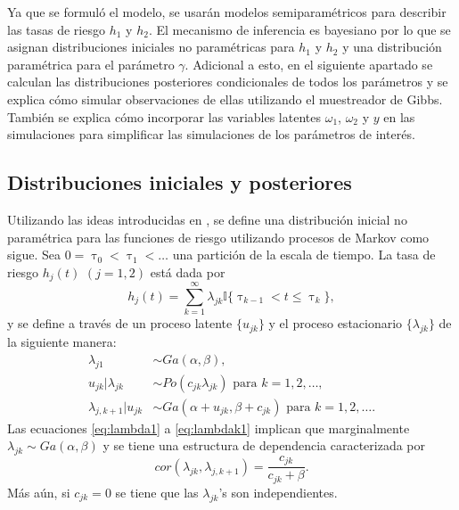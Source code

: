 \documentclass[11pt,a4paper]{article}
\begin{document}
Ya que se formuló el modelo, se usarán modelos semiparamétricos para describir las tasas de riesgo $h_1$ y $h_2$. El mecanismo de inferencia es bayesiano por lo que se asignan distribuciones iniciales no paramétricas para $h_1$ y $h_2$ y una distribución paramétrica para el parámetro $\gamma$.  Adicional a esto, en el siguiente apartado se calculan las distribuciones posteriores condicionales de todos los parámetros y se explica cómo simular observaciones de ellas utilizando el muestreador de Gibbs. También se explica cómo incorporar las variables latentes $\omega_1$, $\omega_2$ y $y$ en las simulaciones para simplificar las simulaciones de los parámetros de interés.

\subsection{Distribuciones iniciales y posteriores}
\label{sec:ini_post}

Utilizando las ideas introducidas en \citet{old_nieto}, se define una distribución inicial no paramétrica para las funciones de riesgo utilizando procesos de Markov como sigue. Sea $0 = \uptau_0 < \uptau_1 < \dots$ una partición de la escala de tiempo. La tasa de riesgo $h_j(t)$ $(j = 1, 2)$ está dada por $$h_j(t) = \sum_{k=1}^\infty \lambda_{jk} \mathbb{I}\lbrace \uptau_{k-1} < t \leq \uptau_{k} \rbrace,$$ y se define a través de un proceso latente $\lbrace u_{jk} \rbrace$ y el proceso estacionario $\lbrace \lambda_{jk} \rbrace$ de la siguiente manera:
\begin{align}
\lambda_{j1} &\sim Ga(\alpha, \beta),\label{eq:lambda1}\\
u_{jk} | \lambda_{jk} &\sim Po(c_{jk}\lambda_{jk}) \text{ para } k = 1, 2, \dots,\label{eq:uk}\\
\lambda_{j,k+1}|u_{jk} &\sim Ga(\alpha + u_{jk}, \beta + c_{jk}) \text{ para } k = 1, 2, \dots.\label{eq:lambdak1}
\end{align}
Las ecuaciones \eqref{eq:lambda1} a \eqref{eq:lambdak1} implican que marginalmente $\lambda_{jk} \sim Ga(\alpha, \beta)$ y se tiene una estructura de dependencia caracterizada por $$cor(\lambda_{jk}, \lambda_{j,k+1}) = \frac{c_{jk}}{c_{jk} + \beta}.$$ Más aún, si $c_{jk} = 0$ se tiene que las $\lambda_{jk}$'s son independientes.
\end{document}
